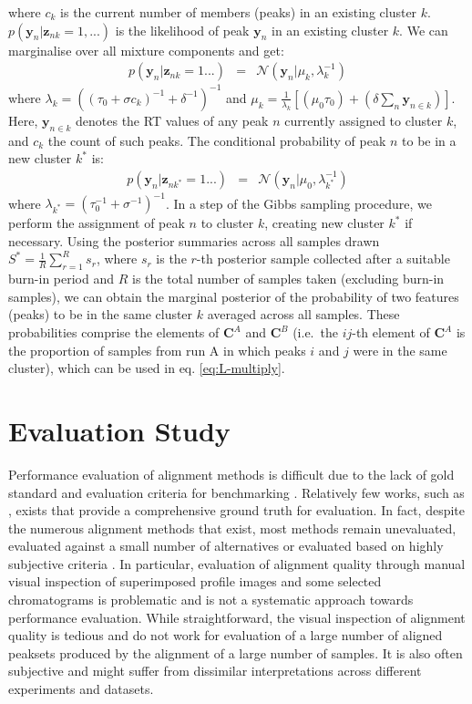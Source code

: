 where $c_{k}$ is the current number of members (peaks) in an existing cluster $k$. $p(\mathbf{y}_{n}|\boldsymbol{z}_{nk}=1,...)$ is the likelihood of peak $\mathbf{y}_{n}$ in an existing cluster $k$. We can marginalise over all mixture components and get: 
\begin{eqnarray}
p(\mathbf{y}_{n}|\boldsymbol{z}_{nk}=1...) & = & \mathcal{N}(\mathbf{y}_{n}|\mu_{k},\lambda_{k}^{-1})\label{eq:15}
\end{eqnarray}
where $\lambda_{k}=((\tau_{0}+\sigma c_{k})^{-1}+\delta^{-1})^{-1}$ and $\mu_{k}=\frac{1}{\lambda_{k}}\left[(\mu_{0}\tau_{0})+(\delta\sum_{n}\mathbf{y}_{n\in k})\right]$. Here, $\mathbf{y}_{n\in k}$ denotes the RT values of any peak $n$ currently assigned to cluster $k$, and $c_{k}$ the count of such peaks. The conditional probability of peak $n$ to be in a new cluster
$k^{*}$ is:
\begin{eqnarray}
p(\mathbf{y}_{n}|\boldsymbol{z}_{nk^{*}}=1...) & = & \mathcal{N}(\mathbf{y}_{n}|\mu_{0},\lambda_{k^{*}}^{-1})\label{eq:15-1}
\end{eqnarray}
where $\lambda_{k^{*}}=(\tau_{0}^{-1}+\sigma^{-1})^{-1}$.
In a step of the Gibbs sampling procedure, we perform the assignment of peak $n$ to cluster $k$, creating new cluster $k^{*}$ if necessary. Using the posterior summaries across all samples drawn $S^{*}=\frac{1}{R}\sum_{r=1}^{R}s{}_{r}$, where $s{}_{r}$ is the $r$-th posterior sample collected after a suitable burn-in period and $R$ is the total number of samples taken (excluding burn-in samples), we can obtain the marginal posterior of the probability of two features (peaks) to be in the same cluster $k$ averaged across all samples. These probabilities comprise the elements of $\mathbf{C}^A$ and $\mathbf{C}^B$ (i.e.\ the $ij$-th element of $\mathbf{C}^A$ is the proportion of samples from run A in which peaks $i$ and $j$ were in the same cluster), which can be used in eq. \ref{eq:L-multiply}.

\section{Evaluation Study\label{sub:evaluation-study}}

Performance evaluation of alignment methods is difficult due to the lack of gold standard and evaluation criteria for benchmarking \cite{Castillo2011,Smith2013a}. Relatively few works, such as \cite{Lange2008}, exists that provide a comprehensive ground truth for evaluation. In fact, despite the numerous alignment methods that exist, most methods remain unevaluated, evaluated against a small number of alternatives or evaluated based on highly subjective criteria \cite{Smith2013}. In particular, evaluation of alignment quality through manual visual inspection of superimposed profile images and some selected chromatograms is problematic and is not a systematic approach towards performance evaluation. While straightforward, the visual inspection of alignment quality is tedious and do not work for evaluation of a large number of aligned peaksets produced by the alignment of a large number of samples. It is also often subjective and might suffer from dissimilar interpretations across different experiments and datasets. 


